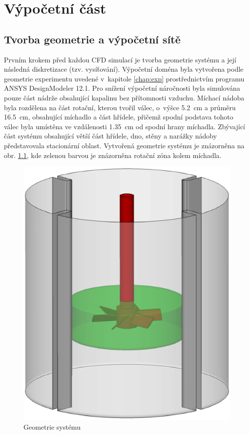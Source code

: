 \chapter{Výpočetní část}

\section{Tvorba geometrie a výpočetní sítě}

Prvním krokem před každou CFD simulací je tvorba geometrie systému a její následná diskretizace (tzv. vysíťování). Výpočetní doména byla vytvořena podle geometrie experimentu uvedené v~kapitole \ref{chap:exp} prostřednictvím programu ANSYS DesignModeler 12.1. Pro snížení výpočetní náročnosti byla simulována pouze část nádrže obsahující kapalinu bez přítomnosti vzduchu. Míchací nádoba byla rozdělena na část rotační, kterou tvořil válec, o~výšce \SI{5.2}{\centi\meter} a průměru \SI{16.5}{\centi\meter}, obsahující míchadlo a část hřídele, přičemž spodní podstava tohoto válec byla umístěna ve vzdálenosti \SI{1.35}{\centi\meter} od spodní hrany míchadla. Zbývající část systému obsahující větší část hřídele, dno, stěny a narážky nádoby představovala stacionární oblast. Vytvořená geometrie systému je znázorněna na obr. \ref{fig:geo}, kde zelenou barvou je znázorněna rotační zóna kolem míchadla. 

\begin{figure}[h!]
\centering
\includegraphics[scale=0.5]{images/geo.eps}
\caption{Geometrie systému}
\label{fig:geo}
\end{figure} 

